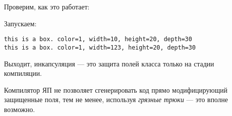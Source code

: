 

Проверим, как это работает:



Запускаем:

\begin{lstlisting}
this is a box. color=1, width=10, height=20, depth=30
this is a box. color=1, width=123, height=20, depth=30
\end{lstlisting}

Выходит, инкапсуляция --- это защита полей класса только на стадии компиляции.

Компилятор ЯП \Cpp не позволяет сгенерировать код прямо
модифицирующий защищенные поля, тем не менее, используя \emph{грязные трюки} --- это вполне возможно.


